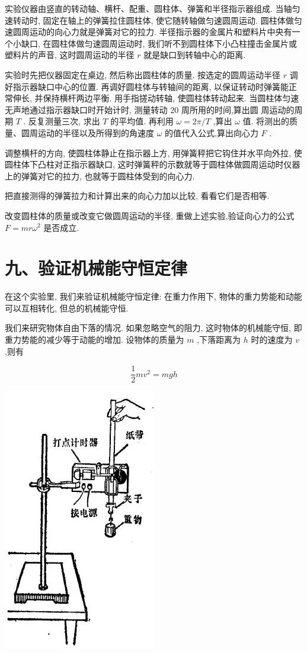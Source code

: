 \documentclass[10pt]{article}
\begin{document}
实验仪器由竖直的转动轴、横杆、配重、圆柱体、弹簧和半径指示器组成. 当轴匀速转动时, 固定在轴上的弹簧拉住圆柱体, 使它随转轴做匀速圆周运动. 圆柱体做匀速圆周运动的向心力就是弹簧对它的拉力. 半径指示器的金属片和塑料片中央有一个小缺口, 在圆柱体做匀速圆周运动时, 我们听不到圆柱体下小凸柱撞击金属片或塑料片的声音, 这时圆周运动的半径 \(r\) 就是缺口到转轴中心的距离.

实验时先把仪器固定在桌边, 然后称出圆柱体的质量. 按选定的圆周运动半径 \(r\) 调好指示器缺口中心的位置. 再调好圆柱体与转轴间的距离, 以保证转动时弹簧能正常伸长, 并保持横杆两边平衡. 用手指搓动转轴, 使圆柱体转动起来. 当圆柱体匀速无声地通过指示器缺口时开始计时, 测量转动 20 周所用的时间,算出圆 周运动的周期 \(T\) . 反复测量三次, 求出 \(T\) 的平均值. 再利用 \(\omega = {2\pi }/T\) ,算出 \(\omega\) 值. 将测出的质量、圆周运动的半径以及所得到的角速度 \(\omega\) 的值代入公式,算出向心力 \(F\) .

调整横杆的方向, 使圆柱体静止在指示器上方, 用弹簧秤把它钩住并水平向外拉, 使圆柱体下凸柱对正指示器缺口, 这时弹簧秤的示数就等于圆柱体做圆周运动时仪器上的弹簧对它的拉力, 也就等于圆柱体受到的向心力.

把直接测得的弹簧拉力和计算出来的向心力加以比较, 看看它们是否相等.

改变圆柱体的质量或改变它做圆周运动的半径, 重做上述实验,验证向心力的公式 \(F = {mr}{\omega }^{2}\) 是否成立.

\section*{九、验证机械能守恒定律}

在这个实验里, 我们来验证机械能守恒定律: 在重力作用下, 物体的重力势能和动能可以互相转化, 但总的机械能守恒.

我们来研究物体自由下落的情况. 如果忽略空气的阻力, 这时物体的机械能守恒, 即重力势能的减少等于动能的增加. 设物体的质量为 \(m\) ,下落距离为 \(h\) 时的速度为 \(v\) ,则有

\[
\frac{1}{2}m{v}^{2} = {mgh} \tag{1}
\]

\begin{center}
\includegraphics[max width=0.5\textwidth]{images/01912d55-147c-70aa-b0e0-1782a122f948_333_900147.jpg}
\end{center}
\end{document}
